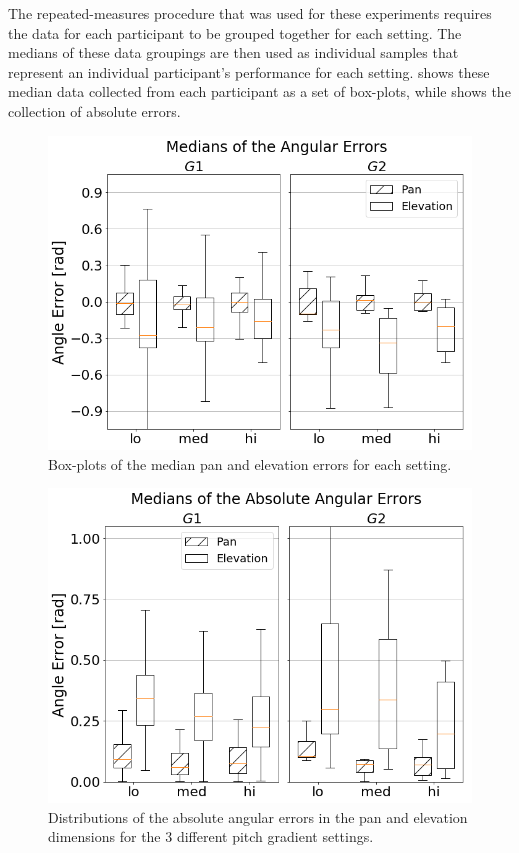 \documentclass[]{interact}
\begin{document}
The repeated-measures procedure that was used for these experiments requires the data for each participant to be grouped together for each setting.
The medians of these data groupings are then used as individual samples that represent an individual participant's performance for each setting.
 shows these median data collected from each participant as a set of box-plots, while  shows the collection of absolute errors.

\begin{figure}
  \centering
  \includegraphics[width=1.0\textwidth]{figures/boxplot_target_search_median_error.png}
  \caption{Box-plots of the median pan and elevation errors for each setting. }\label{fig:target-boxplot-error}
\end{figure}

\begin{figure}
  \centering
  \includegraphics[width=1.0\textwidth]{figures/boxplot_target_search_absolute_median_error.png}
  \caption{Distributions of the absolute angular errors in the pan and elevation dimensions for the 3 different pitch gradient settings. }\label{fig:target-boxplot-absolute-errors}
\end{figure}
\end{document}
